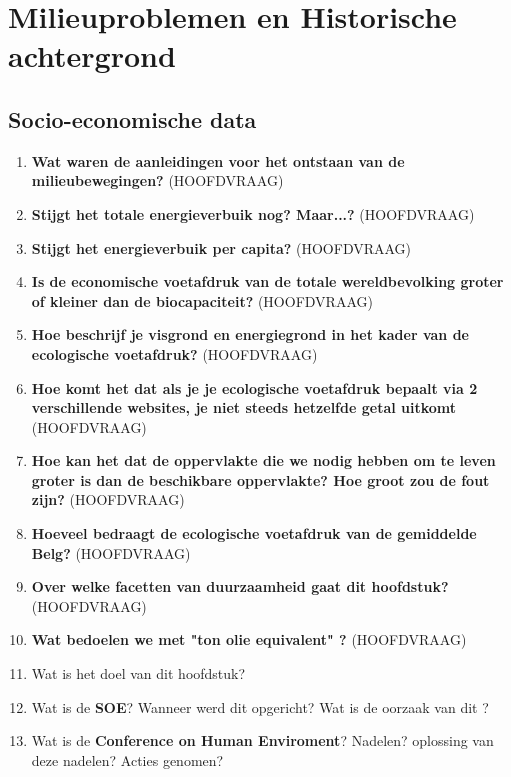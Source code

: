 \documentclass[12pt]{article}
\begin{document}
    \maketitle

    \section{Milieuproblemen en Historische achtergrond}
    \subsection{Socio-economische data}
    \begin{enumerate}
        \item \textbf{Wat waren de aanleidingen voor het ontstaan van de milieubewegingen?} (HOOFDVRAAG)
        \item \textbf{Stijgt het totale energieverbuik nog? Maar...?} (HOOFDVRAAG)
        \item \textbf{Stijgt het energieverbuik per capita?} (HOOFDVRAAG)
        \item \textbf{Is de economische voetafdruk van de totale wereldbevolking groter of kleiner dan de biocapaciteit?} (HOOFDVRAAG)
        \item \textbf{Hoe beschrijf je visgrond en energiegrond in het kader van de ecologische voetafdruk?} (HOOFDVRAAG)
        \item \textbf{Hoe komt het dat als je je ecologische voetafdruk bepaalt via 2 verschillende websites, je niet steeds hetzelfde getal uitkomt} (HOOFDVRAAG)
        \item \textbf{Hoe kan het dat de oppervlakte die we nodig hebben om te leven groter is dan de beschikbare oppervlakte? Hoe groot zou de fout zijn?} (HOOFDVRAAG)
        \item \textbf{Hoeveel bedraagt de ecologische voetafdruk van de gemiddelde Belg?} (HOOFDVRAAG)
        \item \textbf{Over welke facetten van duurzaamheid gaat dit hoofdstuk?} (HOOFDVRAAG)
        \item \textbf{Wat bedoelen we met "ton olie equivalent" ?} (HOOFDVRAAG)
        \item Wat is het doel van dit hoofdstuk?
        \item Wat is de \textbf{SOE}? Wanneer werd dit opgericht? Wat is de oorzaak van dit ?
        \item Wat is de \textbf{Conference on Human Enviroment}? Nadelen? oplossing van deze nadelen? Acties genomen?

\end{enumerate}
\end{document}
